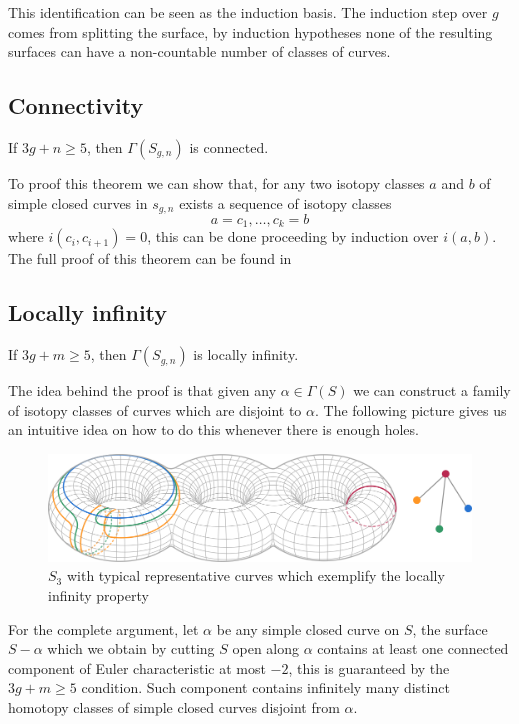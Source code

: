 This identification can be seen as the induction basis. The induction step over $g$ comes from splitting the surface, by induction hypotheses none of the resulting surfaces can have a non-countable number of classes of curves.

\subsection{Connectivity}
\begin{theorem}
If $3g+n\geq 5$, then $\Gamma(S_{g,n})$ is connected.
\end{theorem}

To proof this theorem we can show that, for any two isotopy classes $a$ and $b$ of simple closed curves in $s_{g,n}$ exists a sequence of isotopy classes
$$a=c_{1},\dots,c_{k}=b$$
where $i(c_{i},c_{i+1})=0$, this can be done proceeding by induction over $i(a,b)$. The full proof of this theorem can be found in \cite[Farb p.~93]{Farb} 

\subsection{Locally infinity}
\begin{theorem}
If $3g+m\geq 5$, then $\Gamma(S_{g,n})$ is locally infinity.
\end{theorem}
The idea behind the proof is that given any $\alpha \in \Gamma(S)$ we can construct a family of isotopy classes of curves which are disjoint to $\alpha$. The following picture gives us an intuitive idea on how to do this whenever there is enough holes.
\vspace{1cm}
\begin{figure}[h!]
	\centering
	\includegraphics[scale=0.6]{Figures/Locally-infinite.png}
	\caption{$S_{3}$ with typical representative curves which exemplify the locally infinity property}
\end{figure}

For the complete argument, let $\alpha$ be any simple closed curve on $S$, the surface $S-\alpha$ which we obtain by cutting $S$ open along $\alpha$ contains at least one connected component of Euler characteristic at most $-2$, this is guaranteed by the $3g+m\geq 5$ condition. Such component contains infinitely many distinct homotopy classes of simple closed curves disjoint from $\alpha$.

